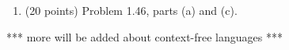 \documentclass[12pt]{article}
\theoremstyle{definition}
\begin{document}
\begin{enumerate}
\item (20 points) Problem 1.46, parts (a) and (c).

\end{enumerate}

*** more will be added about context-free languages ***
\end{document}
